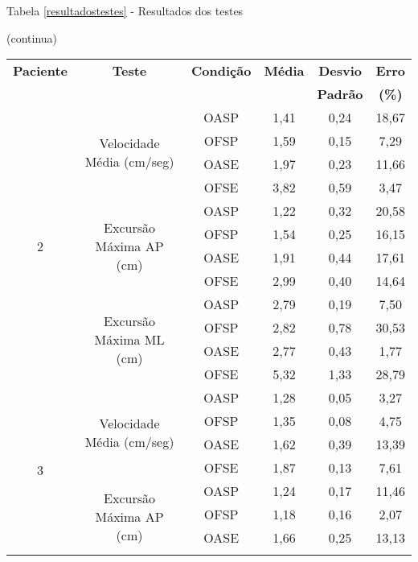 \begin{apendicesenv}
\begin{table}[ht]
\begin{flushleft}
Tabela \ref{resultadostestes} - Resultados dos testes
\begin{flushright}
(continua)
\end{flushright}
\end{flushleft}
\begin{tabular}{|c|c|c|c|c|c|}
\hline
\textbf{Paciente}   & \textbf{Teste}                             & \textbf{Condição} & \textbf{Média} & \textbf{Desvio} & \textbf{Erro} \\
& & & & \textbf{Padrão} & \textbf{(\%)} \\ \hline
\multirow{12}{*}{2} & \multirow{4}{*}{Velocidade Média (cm/seg)} & OASP & 1,41 & 0,24 & 18,67 \\ \cline{3-6} 
 &  & OFSP & 1,59 & 0,15 & 7,29 \\ \cline{3-6} 
 &  & OASE & 1,97 & 0,23 & 11,66 \\ \cline{3-6} 
 &  & OFSE & 3,82 & 0,59 & 3,47 \\ \cline{2-6} 
 & \multirow{4}{*}{Excursão Máxima AP (cm)} & OASP & 1,22 & 0,32 & 20,58 \\ \cline{3-6} 
 &  & OFSP & 1,54 & 0,25 & 16,15 \\ \cline{3-6} 
 &  & OASE & 1,91 & 0,44 & 17,61 \\ \cline{3-6} 
 &  & OFSE & 2,99 & 0,40 & 14,64 \\ \cline{2-6} 
 & \multirow{4}{*}{Excursão Máxima ML (cm)} & OASP & 2,79 & 0,19 & 7,50 \\ \cline{3-6} 
 &  & OFSP & 2,82 & 0,78 & 30,53 \\ \cline{3-6} 
 &  & OASE & 2,77 & 0,43 & 1,77 \\ \cline{3-6} 
 &  & OFSE & 5,32 & 1,33 & 28,79 \\ \hline
\multirow{12}{*}{3} & \multirow{4}{*}{Velocidade Média (cm/seg)} & OASP & 1,28 & 0,05 & 3,27 \\ \cline{3-6} 
 &  & OFSP & 1,35 & 0,08 & 4,75 \\ \cline{3-6} 
 &  & OASE & 1,62 & 0,39 & 13,39 \\ \cline{3-6} 
 &  & OFSE & 1,87 & 0,13 & 7,61 \\ \cline{2-6} 
 & \multirow{4}{*}{Excursão Máxima AP (cm)} & OASP & 1,24 & 0,17 & 11,46 \\ \cline{3-6} 
 &  & OFSP & 1,18 & 0,16 & 2,07 \\ \cline{3-6} 
 &  & OASE & 1,66 & 0,25 & 13,13 \\ \cline{3-6} 

\end{tabular}
\end{table}
\end{apendicesenv}
